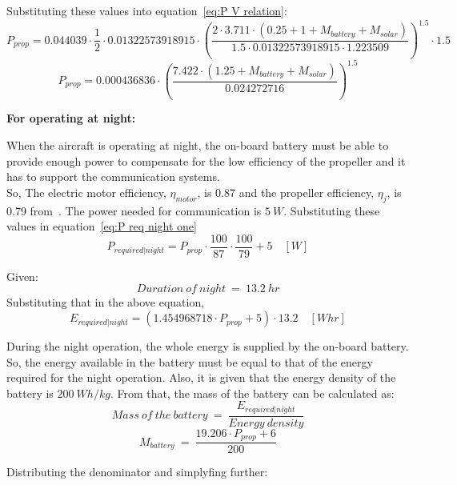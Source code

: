 Substituting these values into equation~\ref{eq:P V relation}:
\[ P_{prop} = 0.044039 \cdot \frac{1}{2} \cdot 0.01322573918915 \cdot \left(\frac{2 \cdot 3.711 \cdot (0.25 + 1 + M_{battery} + M_{solar})}{1.5 \cdot 0.01322573918915 \cdot 1.223509} \right)^{1.5} \cdot 1.5 \]
\[ P_{prop} = 0.000436836 \cdot \left(\frac{7.422 \cdot (1.25 + M_{battery} + M_{solar})}{ 0.024272716 } \right)^{1.5} \]

\p \textbf{For operating at night:}

\p When the aircraft is operating at night, the on-board battery must be able to provide enough power to compensate for the low efficiency of the propeller and it has to support the communication systems. \\
\p So,
\noindent The electric motor efficiency, $\eta_{motor}$, is 0.87 and the propeller efficiency, $\eta_j$, is 0.79 from~\cite{Manual}. The power needed for communication is $5 \ W$. Substituting these values in equation~\ref{eq:P req night one}
\[ P_{required | night} = P_{prop} \cdot \frac{100}{87} \cdot \frac{100}{79} + 5 \quad [W] \]

\noindent Given: \[ Duration \ of \ night \ = \ 13.2 \ hr \]
Substituting that in the above equation,
\[ E_{required | night} = (1.454968718 \cdot P_{prop} + 5) \cdot 13.2 \quad [Whr] \]

\p During the night operation, the whole energy is supplied by the on-board battery. So, the energy available in the battery must be equal to that of the energy required for the night operation. Also, it is given that the energy density of the battery is $ 200 \ Wh/kg $. From that, the mass of the battery can be calculated as:
\[ Mass \ of \ the \ battery \ = \ \frac{ E_{required | night} }{ Energy \ density } \]
\[ M_{battery} \ = \ \frac{ 19.206 \cdot P_{prop} + 6 }{ 200 } \]

\noindent Distributing the denominator and simplyfing further:

